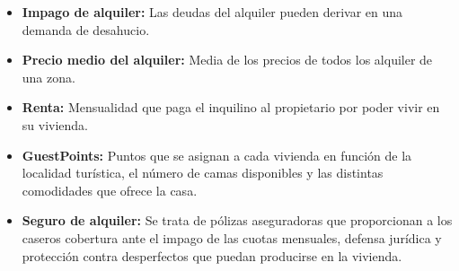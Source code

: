 \begin{itemize}
\item \textbf{Impago de alquiler:} Las deudas del alquiler pueden derivar en una demanda de desahucio.

\item \textbf{Precio medio del alquiler:} Media de los precios de todos los alquiler de una zona.

\item \textbf{Renta:} Mensualidad que paga el inquilino al propietario por poder vivir en su vivienda.

\item \textbf{GuestPoints:} Puntos que se asignan a cada vivienda en función de la localidad turística, el número de camas disponibles y las distintas comodidades que ofrece la casa.

\item \textbf{Seguro de alquiler:} Se trata de pólizas aseguradoras que proporcionan a los caseros cobertura ante el impago de las cuotas mensuales, defensa jurídica y protección contra desperfectos que puedan producirse en la vivienda.


\end{itemize}
